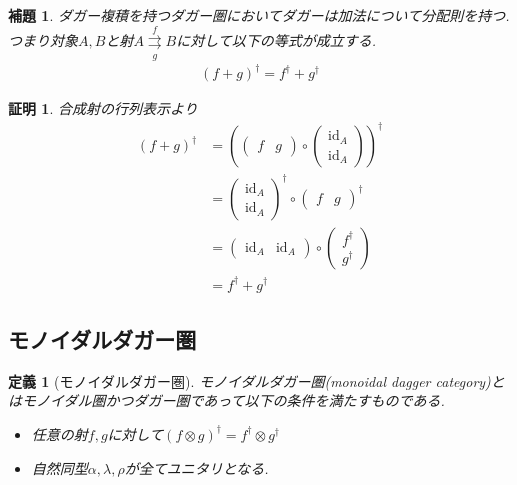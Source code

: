 \documentclass[a4paper,12pt]{ltjsarticle}
\theoremstyle{break}
\newtheorem{defn}[thm]{定義}
\newtheorem{lem}[thm]{補題}
\newtheorem*{prf}{証明}
\newcommand{\id}{\mathrm{id}}
\newcommand{\ci}{\circ}
\newcommand{\al}{\alpha}
\newcommand{\la}{\lambda}
\newcommand{\da}{\dagger}
\newcommand{\ot}{\otimes}
\numberwithin{equation}{section}
\begin{document}
\begin{lem}
  ダガー複積を持つダガー圏においてダガーは加法について分配則を持つ. 
  つまり対象$A,B$と射$A \overset{f}{\underset{g}{\rightrightarrows}} B$に対して以下の等式が成立する.
  \begin{align*}
    (f+g)^\da = f^\da + g^\da
  \end{align*}
\end{lem}

\begin{prf}
  合成射の行列表示より
  \begin{align*}
    (f+g)^\da
    &= \left( 
      \begin{pmatrix}
      f & g
    \end{pmatrix} \ci 
    \begin{pmatrix}
      \id_A \\
      \id_A
    \end{pmatrix}\right)^\da \\
    &= \begin{pmatrix}
      \id_A \\
      \id_A
    \end{pmatrix}^\da
    \ci \begin{pmatrix}
      f & g
    \end{pmatrix}^\da \\
    &= \begin{pmatrix}
      \id_A & \id_A
    \end{pmatrix} \ci 
    \begin{pmatrix}
      f^\da \\
      g^\da
    \end{pmatrix} \\
    &= f^\da + g^\da
  \end{align*}
\end{prf}

\subsection{モノイダルダガー圏}

\begin{defn}[モノイダルダガー圏]
  モノイダルダガー圏(monoidal dagger category)とはモノイダル圏かつダガー圏であって以下の条件を満たすものである. 
  \begin{itemize}
    \item 任意の射$f,g$に対して$(f \ot g)^\da = f^\da \ot g^\da$
    \item 自然同型$\al, \la, \rho$が全てユニタリとなる. 
  \end{itemize}
\end{defn}
\end{document}
